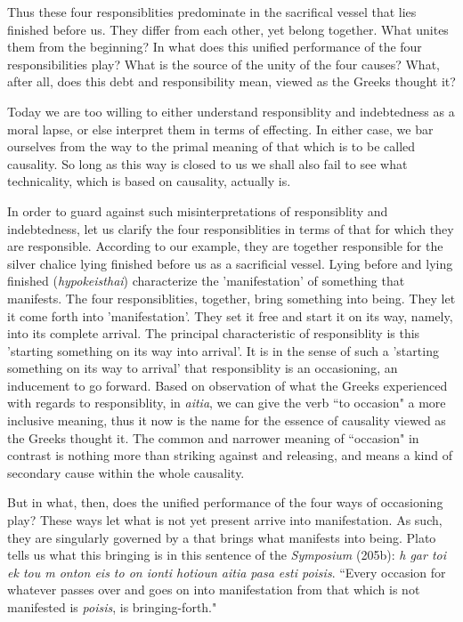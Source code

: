 \documentclass[12pt]{article}
\begin{document}
Thus these four responsiblities predominate in the sacrifical vessel that lies finished before us. They differ from each other, yet belong together. What unites them from the beginning? In what does this unified performance of the four responsibilities play? What is the source of the unity of the four causes? What, after all, does this debt and responsibility mean, viewed as the Greeks thought it? 

Today we are too willing to either understand responsiblity and indebtedness as a moral lapse, or else interpret them in terms of effecting. In either case, we bar ourselves from the way to the primal meaning of that which is to be called causality. So long as this way is closed to us we shall also fail to see what technicality, which is based on causality, actually is.

In order to guard against such misinterpretations of responsiblity and indebtedness, let us clarify the four responsiblities in terms of that for which they are responsible. According to our example, they are together responsible for the silver chalice lying finished before us as a sacrificial vessel. Lying before and lying finished (\textit{hypokeisthai}) characterize the 'manifestation' of something that manifests. The four responsiblities, together, bring something into being. They let it come forth into 'manifestation'. They set it free and start it on its way, namely, into its complete arrival. The principal characteristic of responsiblity is this 'starting something on its way into arrival'. It is in the sense of such a 'starting something on its way to arrival' that responsiblity is an occasioning, an inducement to go forward. Based on observation of what the Greeks experienced with regards to responsiblity, in \textit{aitia}, we can give the verb ``to occasion" a more inclusive meaning, thus it now is the name for the essence of causality viewed as the Greeks thought it. The common and narrower meaning of ``occasion" in contrast is nothing more than striking against and releasing, and means a kind of secondary cause within the whole causality.

But in what, then, does the unified performance of the four ways of occasioning play? These ways let what is not yet present arrive into manifestation. As such, they are singularly governed by a  that brings what manifests into being. Plato tells us what this bringing is in this sentence of the \textit{Symposium} (205b): \textit{h gar toi ek tou m onton eis to on ionti hotioun aitia pasa esti poisis}. ``Every occasion for whatever passes over and goes on into manifestation from that which is not manifested is \textit{poisis}, is bringing-forth."
\end{document}

